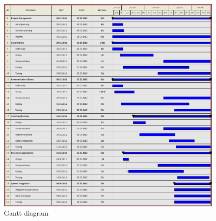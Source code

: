 
\newpage

\begin{figure}[h!]
	\centering \includegraphics[scale=.6]{img/mgmt-gantt.png}
	\caption{Gantt diagram}
	\label{fig:mgmt-gantt}
\end{figure}


